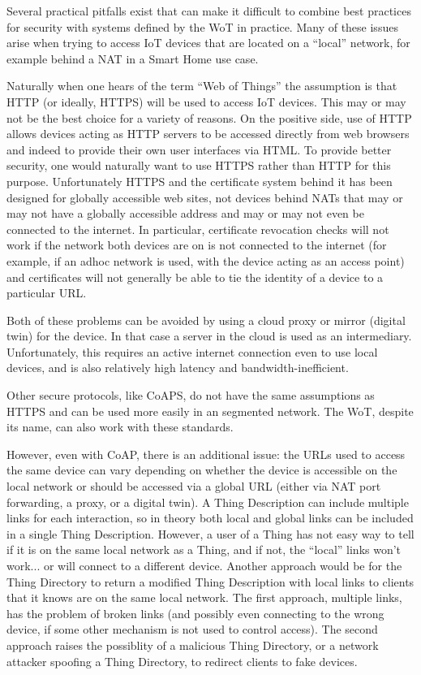 Several practical pitfalls exist that can make it difficult
to combine best practices for security with systems 
defined by the WoT in practice.
Many of these issues arise when trying to access IoT devices
that are located on a ``local'' network,
for example behind a NAT in a Smart Home use case.

Naturally when one hears of the term ``Web of Things'' the
assumption is that HTTP (or ideally, HTTPS) will be used to
access IoT devices. This may or may not be the best choice
for a variety of reasons.  On the positive side, use of HTTP
allows devices acting as HTTP servers to be accessed directly
from web browsers and indeed to provide their own user
interfaces via HTML.  To provide better security, one would
naturally want to use HTTPS rather than HTTP for this purpose.
Unfortunately HTTPS and the certificate system behind it has
been designed for globally accessible web sites, not devices
behind NATs that may or may not have a globally accessible
address and may or may not even be connected to the internet.
In particular, certificate revocation checks will not work if
the network both devices are on is not connected to the internet
(for example, if an adhoc network is used, with the device acting as
an access point) and certificates will not generally be able 
to tie the identity of a device to a particular URL. 

Both of these problems can be avoided by using a cloud proxy
or mirror (digital twin) for the device.  In that case a server
in the cloud is used as an intermediary.  Unfortunately,
this requires an active internet connection even to use 
local devices, and is also relatively high latency and
bandwidth-inefficient.

Other secure protocols, like CoAPS, 
do not have the same assumptions as HTTPS and can be used
more easily in an segmented network.  
The WoT, despite its name, can also work with these standards.

However, even with CoAP, there is an additional issue: the URLs
used to access the same device can vary depending on whether the
device is accessible on the local network or should be accessed
via a global URL (either via NAT port forwarding, a proxy, or
a digital twin).  A Thing Description can include multiple links
for each interaction, so in theory both local and global links
can be included in a single Thing Description.
However, a user of a Thing has not easy way to tell if it is on
the same local network as a Thing, and if not, the ``local'' links
won't work... or will connect to a different device.  Another
approach would be for the Thing Directory to return a modified
Thing Description with local links to clients that it knows 
are on the same local network.  The first approach, multiple
links, has the problem of broken links (and possibly even 
connecting to the wrong device, if some other mechanism is not
used to control access).  The second approach raises the possiblity
of a malicious Thing Directory, or a network attacker spoofing a
Thing Directory, to redirect clients to fake devices.
